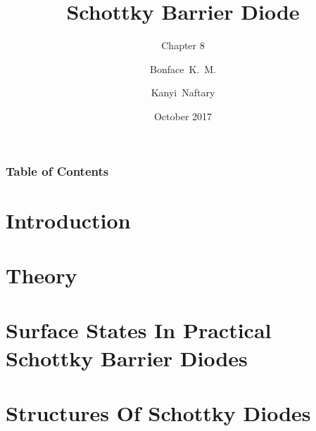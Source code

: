 \documentclass{beamer}
\title{Schottky Barrier Diode}
\subtitle{Chapter 8}
\author{Bonface~K.~M. \and Kanyi~Naftary}
\institute{
  Department of Electrical and Electronic Engineering \\
  University of Nairobi
}
\date{October 2017}
\begin{document}
\frame{\titlepage}
\begin{frame}
  \frametitle{Table of Contents}
  \tableofcontents
\end{frame}

\section{Introduction}



\section{Theory}



\section{Surface States In Practical Schottky Barrier Diodes}



\section{Structures Of Schottky Diodes}

\end{document}
